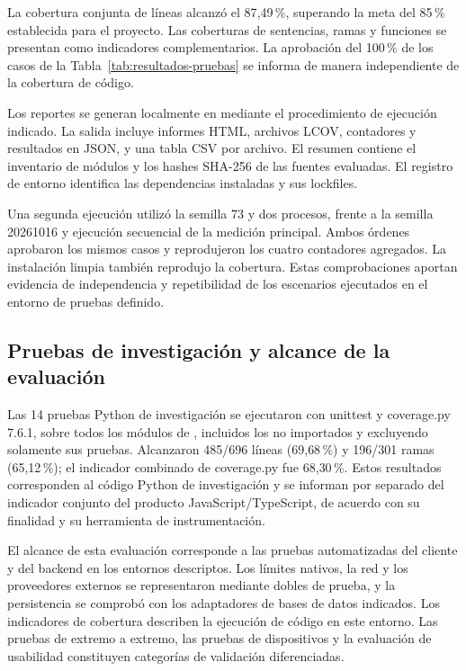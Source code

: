 La cobertura conjunta de líneas alcanzó el 87{,}49\,\%, superando la meta del 85\,\% establecida para el proyecto. Las coberturas de sentencias, ramas y funciones se presentan como indicadores complementarios. La aprobación del 100\,\% de los casos de la Tabla~\ref{tab:resultados-pruebas} se informa de manera independiente de la cobertura de código.

Los reportes se generan localmente en  mediante el procedimiento de ejecución indicado. La salida incluye informes HTML, archivos LCOV, contadores y resultados en JSON, y una tabla CSV por archivo. El resumen contiene el inventario de módulos y los hashes SHA-256 de las fuentes evaluadas. El registro de entorno identifica las dependencias instaladas y sus lockfiles.

Una segunda ejecución utilizó la semilla 73 y dos procesos, frente a la semilla 20261016 y ejecución secuencial de la medición principal. Ambos órdenes aprobaron los mismos casos y reprodujeron los cuatro contadores agregados. La instalación limpia también reprodujo la cobertura. Estas comprobaciones aportan evidencia de independencia y repetibilidad de los escenarios ejecutados en el entorno de pruebas definido.

\subsection{Pruebas de investigación y alcance de la evaluación}

Las 14 pruebas Python de investigación se ejecutaron con unittest y coverage.py 7.6.1, sobre todos los módulos de , incluidos los no importados y excluyendo solamente sus pruebas. Alcanzaron 485/696 líneas (69{,}68\,\%) y 196/301 ramas (65{,}12\,\%); el indicador combinado de coverage.py fue 68{,}30\,\%. Estos resultados corresponden al código Python de investigación y se informan por separado del indicador conjunto del producto JavaScript/TypeScript, de acuerdo con su finalidad y su herramienta de instrumentación.

El alcance de esta evaluación corresponde a las pruebas automatizadas del cliente y del backend en los entornos descriptos. Los límites nativos, la red y los proveedores externos se representaron mediante dobles de prueba, y la persistencia se comprobó con los adaptadores de bases de datos indicados. Los indicadores de cobertura describen la ejecución de código en este entorno. Las pruebas de extremo a extremo, las pruebas de dispositivos y la evaluación de usabilidad constituyen categorías de validación diferenciadas.

